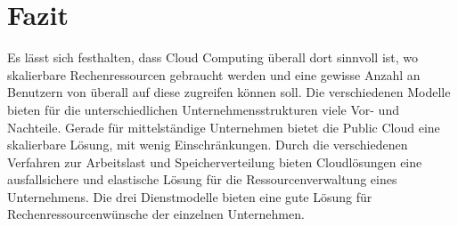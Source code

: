 \section{Fazit}
Es lässt sich festhalten, dass Cloud Computing überall dort sinnvoll ist, wo skalierbare Rechenressourcen gebraucht werden und eine gewisse Anzahl an Benutzern von überall auf diese zugreifen können soll.
Die verschiedenen Modelle bieten für die unterschiedlichen Unternehmensstrukturen viele Vor- und Nachteile. Gerade für mittelständige Unternehmen bietet die Public Cloud eine skalierbare Lösung, mit wenig Einschränkungen. Durch die verschiedenen Verfahren zur Arbeitslast und Speicherverteilung bieten Cloudlösungen eine ausfallsichere und elastische Lösung für die Ressourcenverwaltung eines Unternehmens. Die drei Dienstmodelle bieten eine gute Lösung für Rechenressourcenwünsche der einzelnen Unternehmen.


